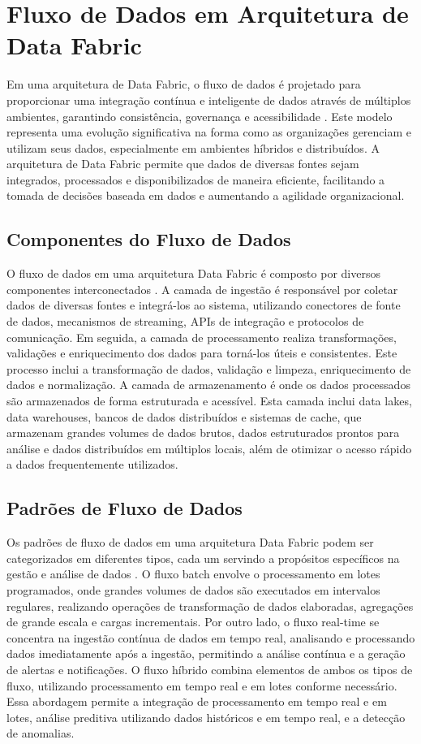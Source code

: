 \section{Fluxo de Dados em Arquitetura de Data Fabric}
Em uma arquitetura de Data Fabric, o fluxo de dados é projetado para proporcionar uma integração contínua e inteligente de dados através de múltiplos ambientes, garantindo consistência, governança e acessibilidade \cite{sharma2023data}. Este modelo representa uma evolução significativa na forma como as organizações gerenciam e utilizam seus dados, especialmente em ambientes híbridos e distribuídos. A arquitetura de Data Fabric permite que dados de diversas fontes sejam integrados, processados e disponibilizados de maneira eficiente, facilitando a tomada de decisões baseada em dados e aumentando a agilidade organizacional.
\subsection{Componentes do Fluxo de Dados}
O fluxo de dados em uma arquitetura Data Fabric é composto por diversos componentes interconectados \cite{hechler2023data}. A camada de ingestão é responsável por coletar dados de diversas fontes e integrá-los ao sistema, utilizando conectores de fonte de dados, mecanismos de streaming, APIs de integração e protocolos de comunicação. Em seguida, a camada de processamento realiza transformações, validações e enriquecimento dos dados para torná-los úteis e consistentes. Este processo inclui a transformação de dados, validação e limpeza, enriquecimento de dados e normalização.
A camada de armazenamento é onde os dados processados são armazenados de forma estruturada e acessível. Esta camada inclui data lakes, data warehouses, bancos de dados distribuídos e sistemas de cache, que armazenam grandes volumes de dados brutos, dados estruturados prontos para análise e dados distribuídos em múltiplos locais, além de otimizar o acesso rápido a dados frequentemente utilizados.
\subsection{Padrões de Fluxo de Dados}
Os padrões de fluxo de dados em uma arquitetura Data Fabric podem ser categorizados em diferentes tipos, cada um servindo a propósitos específicos na gestão e análise de dados \cite{blohm2024data}. O fluxo batch envolve o processamento em lotes programados, onde grandes volumes de dados são executados em intervalos regulares, realizando operações de transformação de dados elaboradas, agregações de grande escala e cargas incrementais. Por outro lado, o fluxo real-time se concentra na ingestão contínua de dados em tempo real, analisando e processando dados imediatamente após a ingestão, permitindo a análise contínua e a geração de alertas e notificações.
O fluxo híbrido combina elementos de ambos os tipos de fluxo, utilizando processamento em tempo real e em lotes conforme necessário. Essa abordagem permite a integração de processamento em tempo real e em lotes, análise preditiva utilizando dados históricos e em tempo real, e a detecção de anomalias.
